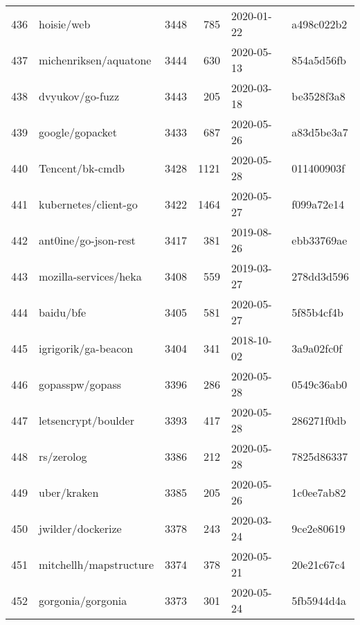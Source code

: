 \begin{footnotesize}
\begin{longtable}{llrrll}
        436 &                                         hoisie/web &   3448 &    785 & 2020-01-22 &  a498c022b2 \\
        437 &                              michenriksen/aquatone &   3444 &    630 & 2020-05-13 &  854a5d56fb \\
        438 &                                    dvyukov/go-fuzz &   3443 &    205 & 2020-03-18 &  be3528f3a8 \\
        439 &                                    google/gopacket &   3433 &    687 & 2020-05-26 &  a83d5be3a7 \\
        440 &                                    Tencent/bk-cmdb &   3428 &   1121 & 2020-05-28 &  011400903f \\
        441 &                               kubernetes/client-go &   3422 &   1464 & 2020-05-27 &  f099a72e14 \\
        442 &                               ant0ine/go-json-rest &   3417 &    381 & 2019-08-26 &  ebb33769ae \\
        443 &                              mozilla-services/heka &   3408 &    559 & 2019-03-27 &  278dd3d596 \\
        444 &                                          baidu/bfe &   3405 &    581 & 2020-05-27 &  5f85b4cf4b \\
        445 &                                igrigorik/ga-beacon &   3404 &    341 & 2018-10-02 &  3a9a02fc0f \\
        446 &                                    gopasspw/gopass &   3396 &    286 & 2020-05-28 &  0549c36ab0 \\
        447 &                                letsencrypt/boulder &   3393 &    417 & 2020-05-28 &  286271f0db \\
        448 &                                         rs/zerolog &   3386 &    212 & 2020-05-28 &  7825d86337 \\
        449 &                                        uber/kraken &   3385 &    205 & 2020-05-26 &  1c0ee7ab82 \\
        450 &                                  jwilder/dockerize &   3378 &    243 & 2020-03-24 &  9ce2e80619 \\
        451 &                             mitchellh/mapstructure &   3374 &    378 & 2020-05-21 &  20e21c67c4 \\
        452 &                                  gorgonia/gorgonia &   3373 &    301 & 2020-05-24 &  5fb5944d4a \\

\end{longtable}
\end{footnotesize}
